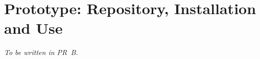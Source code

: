 \section{Prototype: Repository, Installation and Use}
\label{app:prototype}
\emph{To be written in PR~B.}
